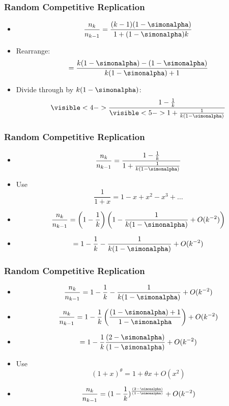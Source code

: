 \begin{frame}
  \frametitle{Random Competitive Replication}

  \begin{itemize}
  \item <1->
    $$  \frac{n_k}{n_{k-1}}
    =
    \frac{(k-1)(1-\simonalpha)}
    {1+(1-\simonalpha)k}
    $$ 
  \item <2->
    Rearrange:
    $$
    = \frac{k(1-\simonalpha) - (1-\simonalpha)}
    {k(1-\simonalpha) + 1}
    $$
  \item <3->
    Divide through by $k(1-\simonalpha)$:
    $$
    \visible<4->{\frac{1 - \frac{1}{k}}
    {\visible<5->{ 1 + \frac{1}{k(1-\simonalpha)}}}
    }
    $$

  \end{itemize}
  
\end{frame}

\begin{frame}
  \frametitle{Random Competitive Replication}

  \begin{itemize}
  \item  
    $$
    \frac{n_k}{n_{k-1}} =
    \frac{1 - \frac{1}{k}}
    { 1 + \frac{1}{k(1-\simonalpha)}}
    $$
  \item<2-> Use 
    $$ \frac{1}{1+x} = 1 - x + x^2 -x^3 + \ldots $$
  \item<3->
    $$
    \frac{n_k}{n_{k-1}} =
    \left(
      1 - \frac{1}{k}
    \right)
    \left(
      1 - \frac{1}{k(1-\simonalpha)} + O(k^{-2})
    \right)
    $$
  \item<4->
    $$
    =
    1 - \frac{1}{k}
    - \frac{1}{k(1-\simonalpha)} + O(k^{-2})
    $$
  \end{itemize}
\end{frame}


\begin{frame}
  \frametitle{Random Competitive Replication}
  
  \begin{itemize}
  \item<1-> 
    $$ 
    \frac{n_k}{n_{k-1}}
    =
    1 - \frac{1}{k}
    - \frac{1}{k(1-\simonalpha)} + O(k^{-2})
    $$
  \item<1-> 
    $$ 
    \frac{n_k}{n_{k-1}}
    =
    1 
    - \frac{1}{k}
    \left(
      \frac{(1-\simonalpha) + 1}{1-\simonalpha}
    \right)
    + O(k^{-2})
    $$
  \item<2->
    $$
    = 1 - \frac{1}{k}\frac{(2-\simonalpha)}{(1-\simonalpha)}
    + O(k^{-2})
    $$
  \item<3->
    Use
    $$(1+x)^\theta = 1 + \theta x + O(x^2)$$
  \item<4->
    $$
    \frac{n_k}{n_{k-1}}
    = (1 - \frac{1}{k})^{\frac{(2-\simonalpha)}{(1-\simonalpha)}}
    + O(k^{-2})
    $$
  \end{itemize}

\end{frame}
